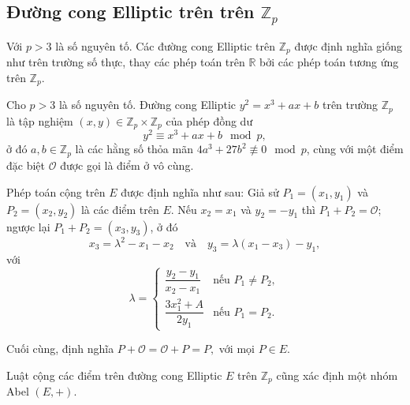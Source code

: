 \documentclass[../main.tex]{subfiles}
\begin{document}
\subsection{Đường cong Elliptic trên trên $ \mathbb{Z}_p$}
Với $p>3$ là số nguyên tố. Các đường cong Elliptic trên $\mathbb{Z}_p$ được định nghĩa giống như trên trường số thực, thay các phép toán trên $\mathbb{R}$ bởi các phép toán tương ứng trên $\mathbb{Z}_p$.
\begin{dn} \rm
Cho $p>3$ là số nguyên tố. Đường cong Elliptic $y^2=x^3+ax+b$ trên trường $\mathbb{Z}_p$ là tập nghiệm $(x,y)\in\mathbb{Z}_p\times \mathbb{Z}_p$ của phép đồng dư
$$y^2\equiv x^3+ax+b\mod p,$$
ở đó $a,b\in \mathbb{Z}_p$ là các hằng số thỏa mãn $4a^3+27b^2\not\equiv 0 \mod p$, cùng với một điểm đặc biệt $\mathcal{O}$ được gọi là điểm ở vô cùng. 
\end{dn} 

Phép toán cộng trên $E$ được định nghĩa như sau: Giả sử $P_1=(x_1,y_1)$ và $P_2=(x_2,y_2)$ là các điểm trên $E$. Nếu $x_2=x_1$ và $y_2=-y_1$ thì $P_1+P_2=\mathcal{O}$; ngược lại $P_1+P_2=(x_3,y_3)$, ở đó
$$x_3=\lambda^2-x_1-x_2\quad \text{và}\quad y_3=\lambda(x_1-x_3)-y_1,$$
với
$$\lambda=\begin{cases}
\dfrac{y_2-y_1}{x_2-x_1}&\text{nếu }P_1\ne P_2,\\
\dfrac{3x_1^2+A}{2y_1}&\text{nếu }P_1=P_2.
\end{cases}$$

Cuối cùng, định nghĩa $P+\mathcal{O}=\mathcal{O}+P=P,$ với mọi $P\in E$.
\begin{cy}
Luật cộng các điểm trên đường cong Elliptic $E$ trên $\mathbb{Z}_p$ cũng xác định một nhóm Abel $(E, +)$.
\end{cy}
\end{document}
